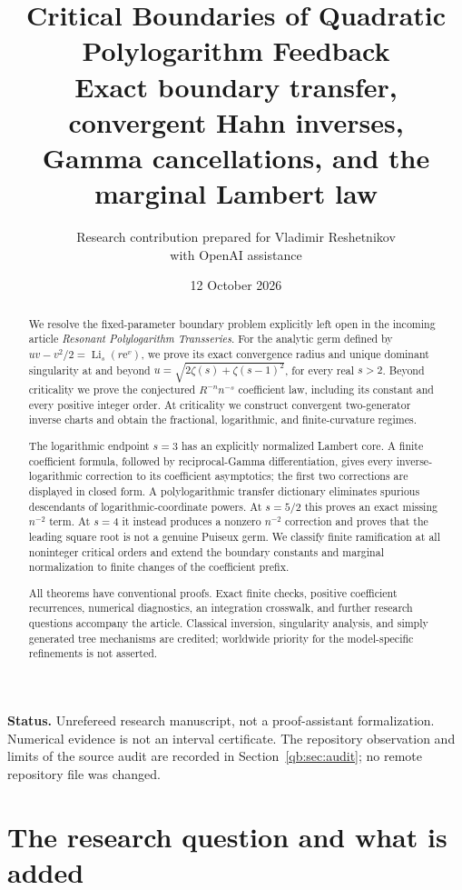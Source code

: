 \documentclass[11pt,a4paper]{article}
\title{Critical Boundaries of Quadratic\\Polylogarithm Feedback\\[5pt]
\large Exact boundary transfer, convergent Hahn inverses,\\
Gamma cancellations, and the marginal Lambert law}
\author{Research contribution prepared for Vladimir Reshetnikov\\
\small with OpenAI assistance}
\date{12 October 2026}
\theoremstyle{definition}\newtheorem{definition}[theorem]{Definition}
\theoremstyle{remark}\newtheorem{remark}[theorem]{Remark}
\newcommand{\Li}{\operatorname{Li}}
\newcommand{\ee}{\mathrm e}
\numberwithin{equation}{section}
\begin{document}
\maketitle
\begin{abstract}
We resolve the fixed-parameter boundary problem explicitly left open in the
incoming article \emph{Resonant Polylogarithm Transseries}. For the analytic
germ defined by
\(uv-v^2/2=\Li_s(r\ee^v)\), we prove its exact convergence radius and unique
dominant singularity at and beyond
\(u=\sqrt{2\zeta(s)+\zeta(s-1)^2}\), for every real $s>2$.
Beyond criticality we prove the conjectured $R^{-n}n^{-s}$ coefficient law,
including its constant and every positive integer order. At criticality we
construct convergent two-generator inverse charts and obtain the fractional,
logarithmic, and finite-curvature regimes.

The logarithmic endpoint $s=3$ has an explicitly normalized Lambert core.
A finite coefficient formula, followed by reciprocal-Gamma differentiation,
gives every inverse-logarithmic correction to its coefficient asymptotics;
the first two corrections are displayed in closed form. A polylogarithmic
transfer dictionary eliminates spurious descendants of logarithmic-coordinate
powers. At $s=5/2$ this proves an exact missing $n^{-2}$ term. At $s=4$ it
instead produces a nonzero $n^{-2}$ correction and proves that the leading
square root is not a genuine Puiseux germ. We classify finite ramification
at all noninteger critical orders and extend the boundary constants and
marginal normalization to finite changes of the coefficient prefix.

All theorems have conventional proofs. Exact finite checks, positive
coefficient recurrences, numerical diagnostics, an integration crosswalk,
and further research questions accompany the article. Classical inversion,
singularity analysis, and simply generated tree mechanisms are credited;
worldwide priority for the model-specific refinements is not asserted.
\end{abstract}
\medskip
\noindent\textbf{Status.} Unrefereed research manuscript, not a proof-assistant
formalization. Numerical evidence is not an interval certificate. The
repository observation and limits of the source audit are recorded in
Section~\ref{qb:sec:audit}; no remote repository file was changed.
\clearpage
\tableofcontents
\clearpage

\section{The research question and what is added}\label{qb:sec:intro}
\end{document}
